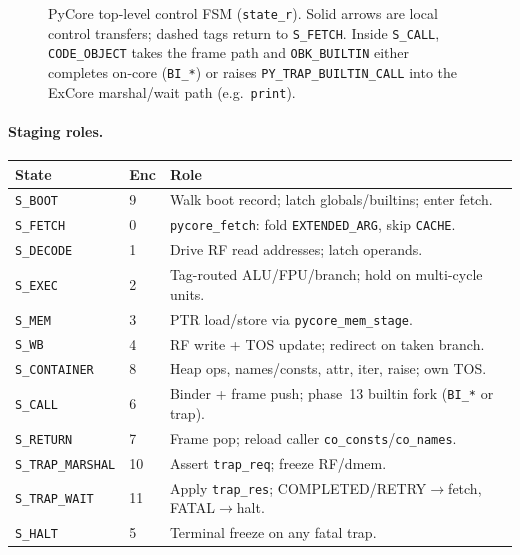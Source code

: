 \documentclass[11pt,a4paper]{article}
\begin{document}
\begin{figure}[H]
{%
}
\caption{PyCore top-level control FSM (\texttt{state\_r}).
Solid arrows are local control transfers; dashed tags return to \texttt{S\_FETCH}.
Inside \texttt{S\_CALL}, \texttt{CODE\_OBJECT} takes the frame path and
\texttt{OBK\_BUILTIN} either completes on-core (\texttt{BI\_*}) or raises
\texttt{PY\_TRAP\_BUILTIN\_CALL} into the ExCore marshal/wait path
(e.g.\ \texttt{print}).}
\label{fig:core-fsm}
\end{figure}

\paragraph{Staging roles.}
\begin{center}
\small
\begin{tabular}{@{}llp{}@{}}
\toprule
State & Enc & Role \\
\midrule
\texttt{S\_BOOT} & 9 & Walk boot record; latch globals/builtins; enter fetch. \\
\texttt{S\_FETCH} & 0 & \texttt{pycore\_fetch}: fold \texttt{EXTENDED\_ARG}, skip \texttt{CACHE}. \\
\texttt{S\_DECODE} & 1 & Drive RF read addresses; latch operands. \\
\texttt{S\_EXEC} & 2 & Tag-routed ALU/FPU/branch; hold on multi-cycle units. \\
\texttt{S\_MEM} & 3 & PTR load/store via \texttt{pycore\_mem\_stage}. \\
\texttt{S\_WB} & 4 & RF write + TOS update; redirect on taken branch. \\
\texttt{S\_CONTAINER} & 8 & Heap ops, names/consts, attr, iter, raise; own TOS. \\
\texttt{S\_CALL} & 6 & Binder + frame push; phase~13 builtin fork (\texttt{BI\_*} or trap). \\
\texttt{S\_RETURN} & 7 & Frame pop; reload caller \texttt{co\_consts}/\texttt{co\_names}. \\
\texttt{S\_TRAP\_MARSHAL} & 10 & Assert \texttt{trap\_req}; freeze RF/dmem. \\
\texttt{S\_TRAP\_WAIT} & 11 & Apply \texttt{trap\_res}; COMPLETED/RETRY$\to$fetch, FATAL$\to$halt. \\
\texttt{S\_HALT} & 5 & Terminal freeze on any fatal trap. \\
\bottomrule
\end{tabular}
\end{center}
\end{document}
